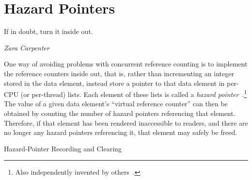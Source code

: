 
\section{Hazard Pointers}
\label{sec:defer:Hazard Pointers}
%
\epigraph{If in doubt, turn it inside out.}{\emph{Zara Carpenter}}

One way of avoiding problems with concurrent reference counting
is to implement the reference counters
inside out, that is, rather than incrementing an integer stored in the
data element, instead store a pointer to that data element in
per-CPU (or per-thread) lists.
Each element of these lists is called a
\emph{hazard pointer}~\cite{MagedMichael04a}.\footnote{
	Also independently invented by others~\cite{HerlihyLM02}.}
The value of a given data element's ``virtual reference counter'' can
then be obtained by counting the number of hazard pointers referencing
that element.
Therefore, if that element has been rendered inaccessible to readers,
and there are no longer any hazard pointers referencing it, that element
may safely be freed.

\begin{listing}[tbp]

\caption{Hazard-Pointer Recording and Clearing}
\label{lst:defer:Hazard-Pointer Recording and Clearing}
\end{listing}

